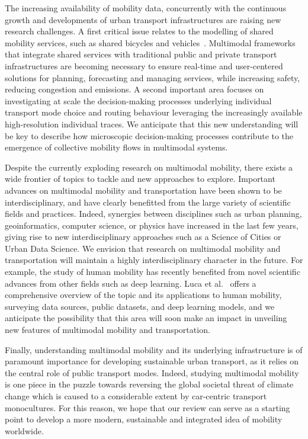 The increasing availability of mobility data, concurrently with the continuous growth and developments of urban transport infrastructures are raising new research challenges. A first critical issue relates to the modelling of shared mobility services, such as shared bicycles and vehicles~\cite{shaheen2016mobility}. Multimodal frameworks that integrate shared services with traditional public and private transport infrastructures are becoming necessary to ensure real-time and user-centered solutions for planning, forecasting and managing services, while increasing safety, reducing congestion and emissions. A second important area focuses on investigating at scale the decision-making processes underlying individual transport mode choice and routing behaviour leveraging the increasingly available high-resolution individual traces. We anticipate that this new understanding will be key to describe how microscopic decision-making processes contribute to the emergence of collective mobility flows in multimodal systems.  

Despite the currently exploding research on multimodal mobility, there exists a wide frontier of topics to tackle and new approaches to explore. Important advances on multimodal mobility and transportation have been shown to be interdisciplinary, and have clearly benefitted from the large variety of scientific fields and practices. Indeed, synergies between disciplines such as urban planning, geoinformatics, computer science, or physics have increased in the last few years, giving rise to new interdisciplinary approaches such as a Science of Cities or Urban Data Science. We envision that research on multimodal mobility and transportation will maintain a highly interdisciplinary character in the future. For example, the study of human mobility has recently benefited from novel scientific advances from other fields such as deep learning. Luca et al.~\cite{luca2020deep} offers a comprehensive overview of the topic and its applications to human mobility, surveying data sources, public datasets, and deep learning models, and we anticipate the possibility that this area will soon make an impact in unveiling new features of multimodal mobility and transportation. 

Finally, understanding multimodal mobility and its underlying infrastructure is of paramount importance for developing sustainable urban transport, as it relies on the central role of public transport modes. Indeed, studying multimodal mobility is one piece in the puzzle towards reversing the global societal threat of climate change which is caused to a considerable extent by car-centric transport monocultures. For this reason, we hope that our review can serve as a starting point to develop a more modern, sustainable and integrated idea of mobility worldwide.
